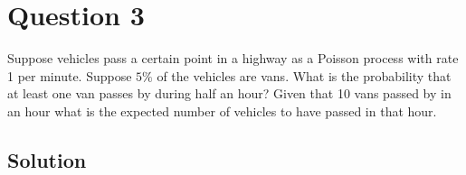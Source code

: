 \section*{Question 3}

Suppose vehicles pass a certain point in a highway as a Poisson process with rate 1 per minute.
Suppose \( 5 \% \) of the vehicles are vans.
What is the probability that at least one van passes by during half an hour?
Given that 10 vans passed by in an hour what is the expected number of vehicles to have passed in that hour.

\subsection*{Solution}
